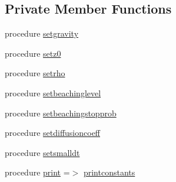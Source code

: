 \subsection*{Private Member Functions}
\begin{DoxyCompactItemize}
\item 
procedure \mbox{\hyperlink{structsimulationglobals__mod_1_1constants__t_aac39b1720d2d3f9a7497c69f83694c9a}{setgravity}}
\item 
procedure \mbox{\hyperlink{structsimulationglobals__mod_1_1constants__t_a6517422a0987640f0574bcce3c6566f1}{setz0}}
\item 
procedure \mbox{\hyperlink{structsimulationglobals__mod_1_1constants__t_a8c3a9d4776bce5b6e7ae475bd7711f0b}{setrho}}
\item 
procedure \mbox{\hyperlink{structsimulationglobals__mod_1_1constants__t_a29fa4fda8d4382821d48942ea8232c15}{setbeachinglevel}}
\item 
procedure \mbox{\hyperlink{structsimulationglobals__mod_1_1constants__t_a6a4777492230476f289f3d0429917d96}{setbeachingstopprob}}
\item 
procedure \mbox{\hyperlink{structsimulationglobals__mod_1_1constants__t_a7fc9e486d28d731757f753174fcfd4b2}{setdiffusioncoeff}}
\item 
procedure \mbox{\hyperlink{structsimulationglobals__mod_1_1constants__t_abae3cbfbc8ed893c747a8088da5372e6}{setsmalldt}}
\item 
procedure \mbox{\hyperlink{structsimulationglobals__mod_1_1constants__t_a287a252cb5c736b4da24d79cf9c59897}{print}} =$>$ \mbox{\hyperlink{namespacesimulationglobals__mod_a139cb36f8366e6aec875c7977235fd68}{printconstants}}
\end{DoxyCompactItemize}

